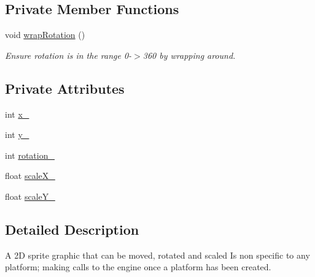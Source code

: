 \subsection*{Private Member Functions}
\begin{DoxyCompactItemize}
\item 
void \hyperlink{class_sprite_ac00655a46db80a5b8b76bce11b351fd1}{wrap\-Rotation} ()
\begin{DoxyCompactList}\small\item\em Ensure rotation is in the range 0-\/$>$360 by wrapping around. \end{DoxyCompactList}\end{DoxyCompactItemize}
\subsection*{Private Attributes}
\begin{DoxyCompactItemize}
\item 
int \hyperlink{class_sprite_ae4b1f0a19b406ffccc78e18f5e40e6f6}{x\-\_\-}
\item 
int \hyperlink{class_sprite_afd9f444fcd6f2d3d6bb0d7686e09d16e}{y\-\_\-}
\item 
int \hyperlink{class_sprite_af429cf5ba45033ece6afa3371ae1ca32}{rotation\-\_\-}
\item 
float \hyperlink{class_sprite_aab809e2cb3503cd71f3acf00cb8bf03a}{scale\-X\-\_\-}
\item 
float \hyperlink{class_sprite_a26863cb8bcd854eb4f4c8777a79ce379}{scale\-Y\-\_\-}
\end{DoxyCompactItemize}


\subsection{Detailed Description}
A 2\-D sprite graphic that can be moved, rotated and scaled Is non specific to any platform; making calls to the engine once a platform has been created. 

